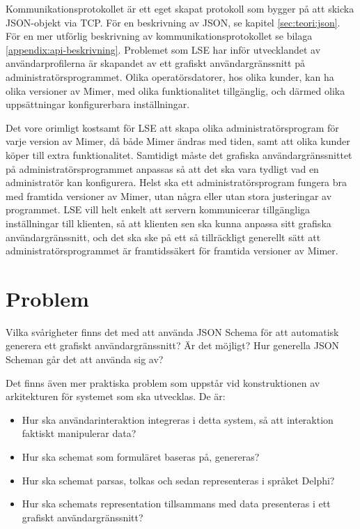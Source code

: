 Kommunikationsprotokollet är ett eget skapat protokoll som bygger på att skicka JSON-objekt via TCP. För en beskrivning av JSON, se kapitel \ref{sec:teori:json}. För en mer utförlig beskrivning av kommunikationsprotokollet se bilaga \ref{appendix:api-beskrivning}. Problemet som LSE har inför utvecklandet av användarprofilerna är skapandet av ett grafiskt användargränssnitt på administratörsprogrammet. Olika operatörsdatorer, hos olika kunder, kan ha olika versioner av Mimer, med olika funktionalitet tillgänglig, och därmed olika uppsättningar konfigurerbara inställningar.

Det vore orimligt kostsamt för LSE att skapa olika administratörsprogram för varje version av Mimer, då både Mimer ändras med tiden, samt att olika kunder köper till extra funktionalitet. Samtidigt måste det grafiska användargränssnittet på administratörsprogrammet anpassas så att det ska vara tydligt vad en administratör kan konfigurera. Helst ska ett administratörsprogram fungera bra med framtida versioner av Mimer, utan några eller utan stora justeringar av programmet. LSE vill helt enkelt att servern kommunicerar tillgängliga inställningar till klienten, så att klienten sen ska kunna anpassa sitt grafiska användargränssnitt, och det ska ske på ett så tillräckligt generellt sätt att administratörsprogrammet är framtidssäkert för framtida versioner av Mimer.

\section{Problem}
\label{sec:intro:problem}
Vilka svårigheter finns det med att använda JSON Schema för att automatisk generera ett grafiskt användargränssnitt? Är det möjligt? Hur generella JSON Scheman går det att använda sig av?

Det finns även mer praktiska problem som uppstår vid konstruktionen av arkitekturen för systemet som ska utvecklas. De är:

\begin{itemize}
	\item Hur ska användarinteraktion integreras i detta system, så att interaktion faktiskt manipulerar data?
	\item Hur ska schemat som formuläret baseras på, genereras?
	\item Hur ska schemat parsas, tolkas och sedan representeras i språket Delphi?
	\item Hur ska schemats representation tillsammans med data presenteras i ett grafiskt användargränssnitt?
\end{itemize}

